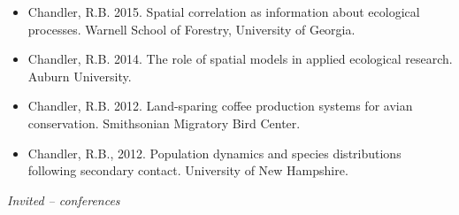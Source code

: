 \documentclass[12pt]{article}
\begin{document}
\begin{itemize}
\item Chandler, R.B. 2015. Spatial correlation as information about
  ecological processes. Warnell School of Forestry, University of
  Georgia. 

\item Chandler, R.B. 2014. The role of spatial models in applied
  ecological research. Auburn University.

\item Chandler, R.B. 2012. Land-sparing coffee production systems for avian
  conservation. Smithsonian Migratory Bird Center. 

\item Chandler, R.B., 2012. Population dynamics and species
  distributions following secondary contact. University of New
  Hampshire. 

\end{itemize}

\emph{Invited -- conferences}
\end{document}
